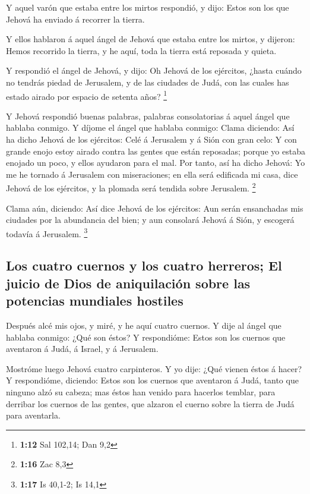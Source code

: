  Y aquel varón que estaba entre los mirtos respondió, y
dijo: Estos son los que Jehová ha enviado á recorrer la tierra.

 Y ellos hablaron á aquel ángel de Jehová que estaba
entre los mirtos, y dijeron: Hemos recorrido la tierra, y he aquí, toda
la tierra está reposada y quieta.

 Y respondió el ángel de Jehová, y dijo: Oh Jehová de los
ejércitos, ¿hasta cuándo no tendrás piedad de Jerusalem, y de las
ciudades de Judá, con las cuales has estado airado por espacio de
setenta años? \footnote{\textbf{1:12} Sal 102,14; Dan 9,2}

 Y Jehová respondió buenas palabras, palabras
consolatorias á aquel ángel que hablaba conmigo.  Y
díjome el ángel que hablaba conmigo: Clama diciendo: Así ha dicho Jehová
de los ejércitos: Celé á Jerusalem y á Sión con gran celo:
 Y con grande enojo estoy airado contra las gentes que
están reposadas; porque yo estaba enojado un poco, y ellos ayudaron para
el mal.  Por tanto, así ha dicho Jehová: Yo me he tornado
á Jerusalem con miseraciones; en ella será edificada mi casa, dice
Jehová de los ejércitos, y la plomada será tendida sobre Jerusalem.
\footnote{\textbf{1:16} Zac 8,3}

 Clama aún, diciendo: Así dice Jehová de los ejércitos:
Aun serán ensanchadas mis ciudades por la abundancia del bien; y aun
consolará Jehová á Sión, y escogerá todavía á Jerusalem. \footnote{\textbf{1:17}
  Is 40,1-2; Is 14,1}

\hypertarget{los-cuatro-cuernos-y-los-cuatro-herreros-el-juicio-de-dios-de-aniquilaciuxf3n-sobre-las-potencias-mundiales-hostiles}{%
\subsection{Los cuatro cuernos y los cuatro herreros; El juicio de Dios
de aniquilación sobre las potencias mundiales
hostiles}\label{los-cuatro-cuernos-y-los-cuatro-herreros-el-juicio-de-dios-de-aniquilaciuxf3n-sobre-las-potencias-mundiales-hostiles}}

 Después alcé mis ojos, y miré, y he aquí cuatro cuernos.
 Y dije al ángel que hablaba conmigo: ¿Qué son éstos? Y
respondióme: Estos son los cuernos que aventaron á Judá, á Israel, y á
Jerusalem.

 Mostróme luego Jehová cuatro carpinteros.
 Y yo dije: ¿Qué vienen éstos á hacer? Y respondióme,
diciendo: Estos son los cuernos que aventaron á Judá, tanto que ninguno
alzó su cabeza; mas éstos han venido para hacerlos temblar, para
derribar los cuernos de las gentes, que alzaron el cuerno sobre la
tierra de Judá para aventarla.


